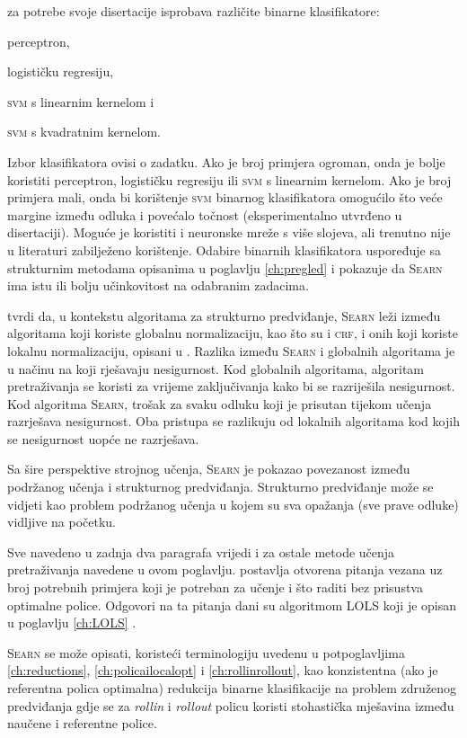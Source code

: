\citeauthor{daume06thesis} za potrebe svoje disertacije isprobava različite
binarne klasifikatore:
\begin{inlinelist}
  \item perceptron,
  \item logističku regresiju,
  \item \textsc{svm} s linearnim kernelom i
  \item \textsc{svm} s kvadratnim kernelom.
\end{inlinelist}
Izbor klasifikatora ovisi o zadatku. Ako je broj primjera ogroman, onda je bolje
koristiti perceptron, logističku regresiju ili \textsc{svm} s linearnim
kernelom. Ako je broj primjera mali, onda bi korištenje \textsc{svm} binarnog
klasifikatora omogućilo što veće margine između odluka i povećalo točnost
(eksperimentalno utvrđeno u disertaciji). Moguće je koristiti i neuronske mreže
s više slojeva, ali trenutno nije u literaturi zabilježeno korištenje. Odabire
binarnih klasifikatora \citeauthor{daume06thesis} uspoređuje sa strukturnim
metodama opisanima u poglavlju \ref{ch:pregled} i pokazuje da \textsc{Searn} ima
istu ili bolju učinkovitost na odabranim zadacima.

\citeauthor{daume06thesis} tvrdi da, u kontekstu algoritama za strukturno
predviđanje, \textsc{Searn} leži između algoritama koji koriste globalnu
normalizaciju, kao što su \mmmm{} i \textsc{crf}, i onih koji koriste lokalnu
normalizaciju, opisani u \citep{punyakanok2001use}. Razlika između
\textsc{Searn} i globalnih algoritama je u načinu na koji rješavaju nesigurnost.
Kod globalnih algoritama, algoritam pretraživanja se koristi za vrijeme
zaključivanja kako bi se razriješila nesigurnost. Kod algoritma \textsc{Searn},
trošak za svaku odluku koji je prisutan tijekom učenja razrješava nesigurnost.
Oba pristupa se razlikuju od lokalnih algoritama kod kojih se nesigurnost uopće
ne razrješava.

Sa šire perspektive strojnog učenja, \textsc{Searn} je pokazao povezanost između
podržanog učenja i strukturnog predviđanja. Strukturno predviđanje može se
vidjeti kao problem podržanog učenja u kojem su sva opažanja (sve prave odluke)
vidljive na početku.

Sve navedeno u zadnja dva paragrafa vrijedi i za ostale metode učenja
pretraživanja navedene u ovom poglavlju. \citeauthor{daume06thesis} postavlja
otvorena pitanja vezana uz broj potrebnih primjera koji je potreban za učenje i
što raditi bez prisustva optimalne police. Odgovori na ta pitanja dani su
algoritmom \textsc{LOLS} koji je opisan u poglavlju \ref{ch:LOLS}
\citep{daume15lols}.

\textsc{Searn} se može opisati, koristeći terminologiju uvedenu u potpoglavljima
\ref{ch:reductions}, \ref{ch:policailocalopt} i \ref{ch:rollinrollout}, kao
konzistentna (ako je referentna polica optimalna) redukcija binarne
klasifikacije na problem združenog predviđanja gdje se za \textit{rollin} i
\textit{rollout} policu koristi stohastička mješavina između naučene i
referentne police.
